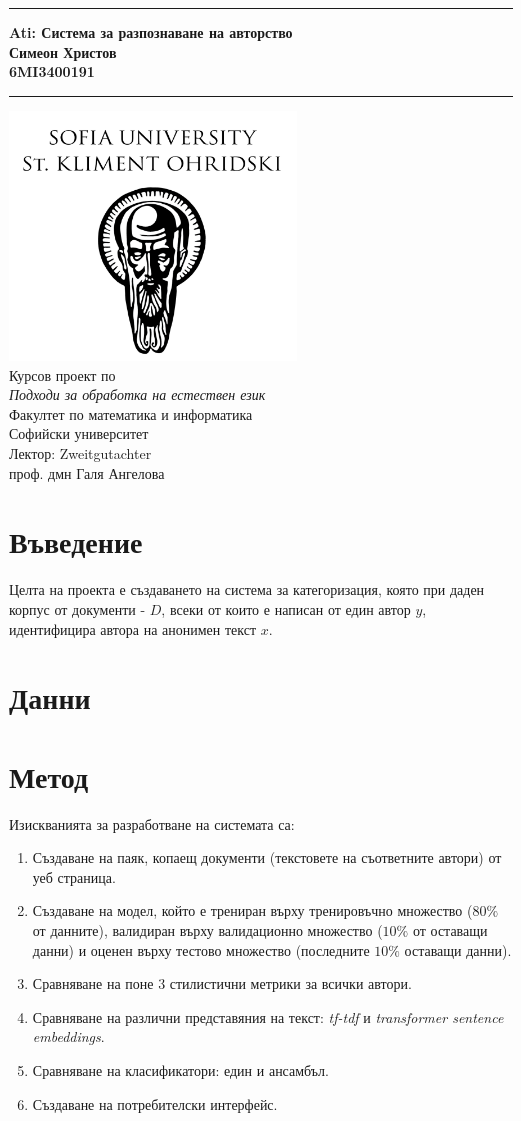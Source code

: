 \documentclass[12pt]{article}
\newcommand{\JMUTitle}[9]{

  \thispagestyle{empty}
  \vspace*{\stretch{1}}
  {\parindent0cm
  \rule{\linewidth}{.7ex}}
  \begin{flushright}
    \vspace*{\stretch{1}}
    \sffamily\bfseries\Huge
    #1\\
    \vspace*{\stretch{1}}
    \sffamily\bfseries\large
    #2\\
    \vspace*{\stretch{1}}
    \sffamily\bfseries\small
    #3
  \end{flushright}
  \rule{\linewidth}{.7ex}

  \vspace*{\stretch{1}}
  \begin{center}
    \includegraphics[width=3in]{./images/logo.png} \\
    \vspace*{\stretch{1}}
    \Large Курсов проект по \\ \textit{Подходи за обработка на естествен език} \\

    \vspace*{\stretch{2}}
    \large Факултет по математика и информатика\\
    \large Софийски университет\\
    
    \vspace*{\stretch{1}}
    \large Лектор: #8 \\[1mm]
    
    \vspace*{\stretch{1}}
    \large #7 \\

  \end{center}
}
\begin{document}
  

  \JMUTitle
      {Ati: Система за разпознаване на авторство}
      {Симеон Христов}
      {6MI3400191}
      
      {Wirtschaftswissenschaftlichen Fakultät}  %
      {W"urzburg 2018}                          %
      {Февруари 2023}                              %
      {проф. дмн Галя Ангелова}               %
      {Zweitgutachter}                          %

  \clearpage

\clearpage



\section{Въведение}

Целта на проекта е създаването на система за категоризация, която при даден корпус от документи - $D$, всеки от които е написан от един автор $y$, идентифицира автора на анонимен текст $x$.
    


\section{Данни}




\section{Метод}


Изискванията за разработване на системата са:

\begin{enumerate}
    \item Създаване на паяк, копаещ документи (текстовете на съответните автори) от уеб страница.
    \item Създаване на модел, който е трениран върху тренировъчно множество ($80\%$ от данните), валидиран върху валидационно множество ($10\%$ от оставащи данни) и оценен върху тестово множество (последните $10\%$ оставащи данни).
    \item Сравняване на поне 3 стилистични метрики за всички автори.
    \item Сравняване на различни представяния на текст: \textit{tf-tdf} и \textit{transformer sentence embeddings}.
    \item Сравняване на класификатори: един и ансамбъл.
    \item Създаване на потребителски интерфейс.
\end{enumerate}
\end{document}
